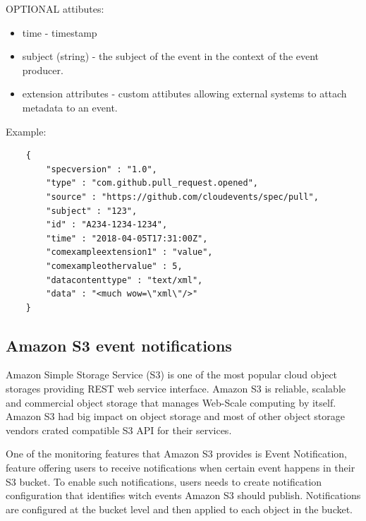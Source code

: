     OPTIONAL attibutes:
    \begin{itemize}
        \item time - timestamp
        \item subject (string) - the subject of the event in the context of the event producer.
        \item extension attributes - custom attibutes allowing external systems to attach metadata to an event.
    \end{itemize}

    Example:
    \begin{lstlisting}
    {
        "specversion" : "1.0",
        "type" : "com.github.pull_request.opened",
        "source" : "https://github.com/cloudevents/spec/pull",
        "subject" : "123",
        "id" : "A234-1234-1234",
        "time" : "2018-04-05T17:31:00Z",
        "comexampleextension1" : "value",
        "comexampleothervalue" : 5,
        "datacontenttype" : "text/xml",
        "data" : "<much wow=\"xml\"/>"
    }
    \end{lstlisting}

    \subsection{Amazon S3 event notifications}
     Amazon Simple Storage Service (S3) is one of the most popular cloud object storages providing REST web service interface. Amazon S3 is reliable, scalable and commercial object storage that manages Web-Scale computing by itself\cite{eventS3}. Amazon S3 had big impact on object storage and most of other object storage vendors crated compatible S3 API for their services.

     One of the monitoring features that Amazon S3 provides is Event Notification, feature offering users to receive notifications when certain event happens in their S3 bucket. To enable such notifications, users needs to create notification configuration that identifies witch events Amazon S3 should publish\cite{eventS3EventNotification}. Notifications are configured at the bucket level and then applied to each object in the bucket.

